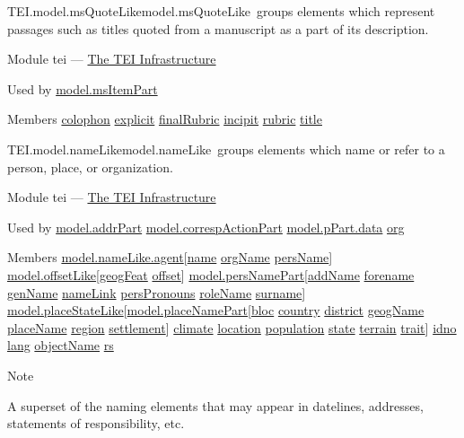 \begin{reflist}
\item[]\begin{specHead}{TEI.model.msQuoteLike}{model.msQuoteLike} groups elements which represent passages such as titles quoted from a manuscript as a part of its description.\end{specHead} 
    \item[{Module}]
  tei — \hyperref[ST]{The TEI Infrastructure}
    \item[{Used by}]
  \hyperref[TEI.model.msItemPart]{model.msItemPart}
    \item[{Members}]
  \hyperref[TEI.colophon]{colophon} \hyperref[TEI.explicit]{explicit} \hyperref[TEI.finalRubric]{finalRubric} \hyperref[TEI.incipit]{incipit} \hyperref[TEI.rubric]{rubric} \hyperref[TEI.title]{title}
\end{reflist}  
\begin{reflist}
\item[]\begin{specHead}{TEI.model.nameLike}{model.nameLike} groups elements which name or refer to a person, place, or organization.\end{specHead} 
    \item[{Module}]
  tei — \hyperref[ST]{The TEI Infrastructure}
    \item[{Used by}]
  \hyperref[TEI.model.addrPart]{model.addrPart} \hyperref[TEI.model.correspActionPart]{model.correspActionPart} \hyperref[TEI.model.pPart.data]{model.pPart.data} \hyperref[TEI.org]{org}
    \item[{Members}]
  \hyperref[TEI.model.nameLike.agent]{model.nameLike.agent}[\hyperref[TEI.name]{name} \hyperref[TEI.orgName]{orgName} \hyperref[TEI.persName]{persName}] \hyperref[TEI.model.offsetLike]{model.offsetLike}[\hyperref[TEI.geogFeat]{geogFeat} \hyperref[TEI.offset]{offset}] \hyperref[TEI.model.persNamePart]{model.persNamePart}[\hyperref[TEI.addName]{addName} \hyperref[TEI.forename]{forename} \hyperref[TEI.genName]{genName} \hyperref[TEI.nameLink]{nameLink} \hyperref[TEI.persPronouns]{persPronouns} \hyperref[TEI.roleName]{roleName} \hyperref[TEI.surname]{surname}] \hyperref[TEI.model.placeStateLike]{model.placeStateLike}[\hyperref[TEI.model.placeNamePart]{model.placeNamePart}[\hyperref[TEI.bloc]{bloc} \hyperref[TEI.country]{country} \hyperref[TEI.district]{district} \hyperref[TEI.geogName]{geogName} \hyperref[TEI.placeName]{placeName} \hyperref[TEI.region]{region} \hyperref[TEI.settlement]{settlement}] \hyperref[TEI.climate]{climate} \hyperref[TEI.location]{location} \hyperref[TEI.population]{population} \hyperref[TEI.state]{state} \hyperref[TEI.terrain]{terrain} \hyperref[TEI.trait]{trait}] \hyperref[TEI.idno]{idno} \hyperref[TEI.lang]{lang} \hyperref[TEI.objectName]{objectName} \hyperref[TEI.rs]{rs}
    \item[{Note}]
  \par
A superset of the naming elements that may appear in datelines, addresses, statements of responsibility, etc.
\end{reflist}  
